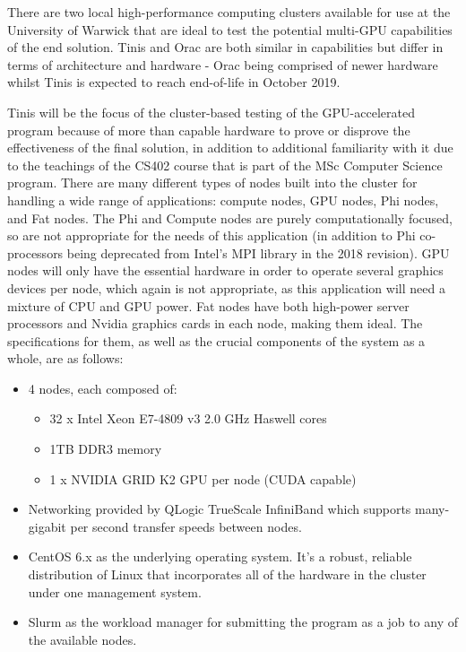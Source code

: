 \documentclass[conference]{IEEEtran}
\begin{document}
There are two local high-performance computing clusters available for use at the University of Warwick that are ideal to test the potential multi-GPU capabilities of the end solution. Tinis and Orac are both similar in capabilities but differ in terms of architecture and hardware - Orac being comprised of newer hardware whilst Tinis is expected to reach end-of-life in October 2019\cite{warwickclusters}.

Tinis will be the focus of the cluster-based testing of the GPU-accelerated program because of more than capable hardware to prove or disprove the effectiveness of the final solution, in addition to additional familiarity with it due to the teachings of the CS402 course that is part of the MSc Computer Science program. There are many different types of nodes built into the cluster for handling a wide range of applications: compute nodes, GPU nodes, Phi nodes, and Fat nodes. The Phi and Compute nodes are purely computationally focused, so are not appropriate for the needs of this application (in addition to Phi co-processors being deprecated from Intel's MPI library in the 2018 revision\cite{intelmpilib_whatsnew}). GPU nodes will only have the essential hardware in order to operate several graphics devices per node, which again is not appropriate, as this application will need a mixture of CPU and GPU power. Fat nodes have both high-power server processors and Nvidia graphics cards in each node, making them ideal. The specifications for them, as well as the crucial components of the system as a whole, are as follows:

\begin{itemize}
    \item 4 nodes, each composed of:
    \begin{itemize}
        \item 32 x Intel Xeon E7-4809 v3 2.0 GHz Haswell cores
        \item 1TB DDR3 memory
        \item 1 x NVIDIA GRID K2 GPU per node (CUDA capable)
    \end{itemize}
    \item Networking provided by QLogic TrueScale InfiniBand which supports many-gigabit per second transfer speeds between nodes.
    \item CentOS 6.x as the underlying operating system. It's a robust, reliable distribution of Linux that incorporates all of the hardware in the cluster under one management system.
    \item Slurm as the workload manager for submitting the program as a job to any of the available nodes.
\end{itemize}
\end{document}
